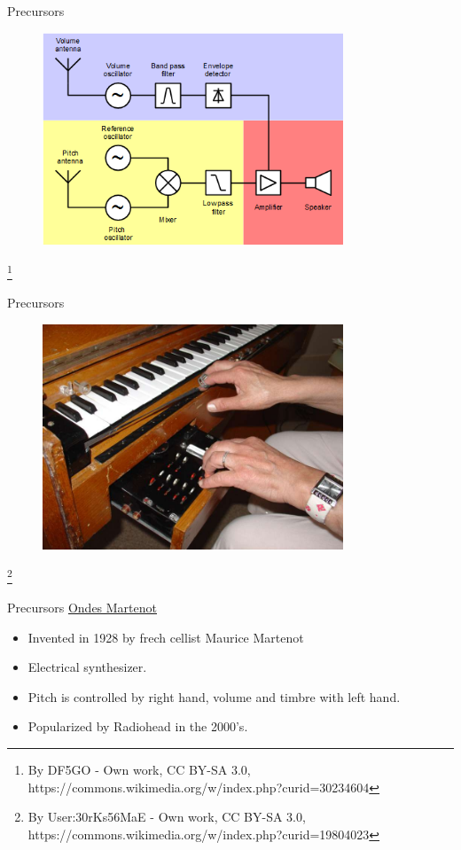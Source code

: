 \documentclass{beamer}
\newcommand\blfootnote[1]{%
  \begingroup
  \renewcommand\thefootnote{}\footnote{#1}%
  \addtocounter{footnote}{-1}%
  \endgroup
}
\begin{document}
\begin{frame}{Precursors}
    \begin{figure}[h]
        \includegraphics[width=0.8\textwidth]{theremin_scheme.png}
    \end{figure}
\blfootnote{By DF5GO - Own work, CC BY-SA 3.0, https://commons.wikimedia.org/w/index.php?curid=30234604}
\end{frame}

\begin{frame}{Precursors}
    \begin{figure}[h]
        \includegraphics[width=0.8\textwidth]{ondes.jpg}
    \end{figure}
\blfootnote{By User:30rKs56MaE - Own work, CC BY-SA 3.0, https://commons.wikimedia.org/w/index.php?curid=19804023}
\end{frame}

\begin{frame}{Precursors}
    \href{https://www.youtube.com/watch?v=v0aflcF0-ys}{Ondes Martenot}
    \vspace{5mm}
    \begin{itemize}
        \item Invented in 1928 by frech cellist Maurice Martenot
        \item Electrical synthesizer.
        \item Pitch is controlled by right hand, volume and timbre with left hand.
        \item Popularized by Radiohead in the 2000's.
    \end{itemize}
\end{frame}
\end{document}
